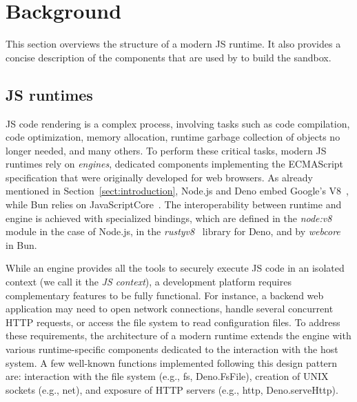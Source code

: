 \section{Background}
\label{sectbackground} 

This section overviews the structure of a modern JS runtime. It also
provides a concise description of the components that are used by \natisand
to build the sandbox.

\vspace{-0.52em}
\subsection{JS runtimes}
\label{sect:background-js-runtime}

JS code rendering is a complex process, involving tasks such as code
compilation, code optimization, memory allocation, runtime garbage
collection of objects no longer needed, and many others. To perform
these critical tasks, modern JS runtimes rely on {\em engines},
dedicated components implementing the ECMAScript specification that
were originally developed for web browsers. As already mentioned in
Section~\ref{sect:introduction}, Node.js and Deno embed Google's
V8~\cite{v8-site}, while Bun relies on
JavaScriptCore~\cite{javascriptcore}. The interoperability between
runtime and engine is achieved with specialized bindings, which are
defined in the {\em node:v8}~\cite{node-v8-bindings} module in the
case of Node.js, in the {\em rusty\textunderscore v8}~\cite{rusty-v8}
library for Deno, and by {\em webcore}~\cite{webcore-bindings} in Bun.

While an engine provides all the tools to securely execute JS code in
an isolated context (we call it the {\em JS context}), a development
platform requires complementary features to be fully functional. For
instance, a backend web application may need to open network
connections, handle several concurrent HTTP requests, or access the
file system to read configuration files. To address these requirements,
the architecture of a modern runtime extends the engine with various
runtime-specific components dedicated to the interaction with the host
system. A few well-known functions implemented following this design
pattern are: interaction with the file system (e.g., fs, Deno.FsFile),
creation of UNIX sockets (e.g., net), and exposure of HTTP servers
(e.g., http, Deno.serveHttp).

